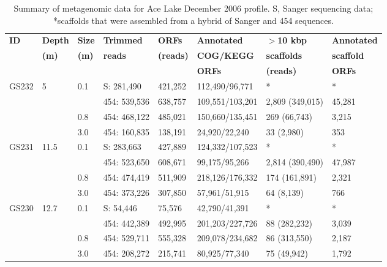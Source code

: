 \begin{table}
\footnotesize
\caption[Summary of metagenomic data for Ace Lake profile]{Summary of metagenomic data for Ace Lake December 2006 profile. S, Sanger sequencing data; *scaffolds that were assembled from a hybrid of Sanger and 454 sequences.}
\label{tab:ace_metag}
\smallskip
\begin{tabularx}{\textwidth}{p{0.6cm}p{0.7cm}p{0.5cm}p{1.8cm}p{1cm}Xp{2.4cm}p{1.4cm}}
\toprule
\textbf{ID} & \textbf{Depth} & \textbf{Size}         & \textbf{Trimmed}      & \textbf{\acp{ORF}} & \textbf{Annotated}            & \textbf{$>$10 kbp} & \textbf{Annotated} \\
            & \textbf{(m)}   & \textbf{(\textmu{}m)} & \textbf{reads}        & \textbf{(reads)}   & \textbf{\acs{COG}/\acs{KEGG}} & \textbf{scaffolds} & \textbf{scaffold} \\
            &                &                       &                       &                    & \textbf{\acp{ORF}}            & \textbf{(reads)}   & \textbf{\acp{ORF}} \\
\midrule
GS232 & 5    & 0.1 & S: 281,490 & 421,252 & 112,490/96,771   & *               & *      \\
      &      &     & 454: 539,536    & 638,757 & 109,551/103,201  & 2,809 (349,015) & 45,281 \\
      &      & 0.8 & 454: 468,122    & 485,021 & 150,660/135,451  & 269 (66,743)    & 3,215  \\
      &      & 3.0 & 454: 160,835    & 138,191 & 24,920/22,240    & 33 (2,980)      & 353    \\ 
GS231 & 11.5 & 0.1 & S: 283,663 & 427,889 & 124,332/107,523  & *               & *      \\
      &      &     & 454: 523,650    & 608,671 & 99,175/95,266    & 2,814 (390,490) & 47,987 \\
      &      & 0.8 & 454: 474,419    & 511,909 & 218,126/176,332  & 174 (161,891)   & 2,321  \\
      &      & 3.0 & 454: 373,226    & 307,850 & 57,961/51,915    & 64 (8,139)      & 766    \\ 
GS230 & 12.7 & 0.1 & S: 54,446  & 75,576  & 42,790/41,391    & *               & *      \\
      &      &     & 454: 442,389    & 492,995 & 201,203/227,726  & 88 (282,232)    & 3,039  \\
      &      & 0.8 & 454: 529,711    & 555,328 & 209,078/234,682  & 86 (313,550)    & 2,187  \\
      &      & 3.0 & 454: 208,272    & 215,741 & 80,925/77,340    & 75 (49,942)     & 1,792  \\ 

\end{tabularx}
\end{table}
